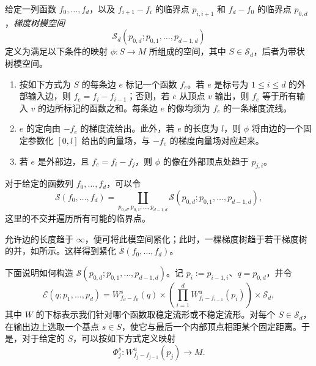 \begin{definition}\label{def:8.10}
给定一列函数 $f_0,\ldots,f_d$，以及 $f_{i+1}-f_i$ 的临界点 $p_{i,i+1}$ 和 $f_d-f_0$ 的临界点 $p_{0,d}$，\emph{梯度树模空间}
\[
\mathcal S_d(p_{0,d};p_{0,1},\ldots,p_{d-1,d})
\]
定义为满足以下条件的映射 $\phi\colon S\to M$ 所组成的空间，其中 $S\in\mathcal S_d$，后者为带状树模空间。
\begin{enumerate}
\item 按如下方式为 $S$ 的每条边 $e$ 标记一个函数 $f_e$。若 $e$ 是标号为 $1\leq i\leq d$ 的外部输入边，则 $f_e=f_i-f_{i-1}$；否则，若 $e$ 从顶点 $v$ 输出，则 $f_e$ 等于所有输入 $v$ 的边所标记的函数之和。每条边 $e$ 的像均须为 $f_e$ 的一条梯度流线。
\item $e$ 的定向由 $-f_e$ 的梯度流给出。此外，若 $e$ 的长度为 $l$，则 $\phi$ 将由边的一个固定参数化 $[0,l]$ 给出的向量场，与 $-f_e$ 的梯度向量场对应起来。
\item 若 $e$ 是外部边，且 $f_e=f_i-f_j$，则 $\phi$ 的像在外部顶点处趋于 $p_{j,i}$。
\end{enumerate}
\end{definition}

对于给定的函数列 $f_0,\ldots,f_d$，可以令
\[
\mathcal S(f_0,\ldots,f_d)=
\coprod_{p_{0,d},p_{0,1},\ldots,p_{d-1,d}}
\mathcal S(p_{0,d};p_{0,1},\ldots,p_{d-1,d}),
\]
这里的不交并遍历所有可能的临界点。

允许边的长度趋于 $\infty$，便可将此模空间紧化；此时，一棵梯度树趋于若干梯度树的并，如所示。这样得到紧化 $\overline{\mathcal S}(f_0,\ldots,f_d)$。

\setcounter{figure}{15}
\begin{figure}[H]
\centering
{}
\BookNumberOnlyCaption\label{fig:8.16}
\end{figure}

下面说明如何构造 $\mathcal S(p_{0,d};p_{0,1},\ldots,p_{d-1,d})$。记 $p_i:=p_{i-1,i}$、$q=p_{0,d}$，并令
\[
\mathcal E(q;p_1,\ldots,p_d)=W^s_{f_d-f_0}(q)
\times\left(\prod_{i=1}^dW^u_{f_i-f_{i-1}}(p_i)\right)\times\mathcal S_d,
\]
其中 $W$ 的下标表示我们针对哪个函数取稳定流形或不稳定流形。对每个 $S\in\mathcal S_d$，在输出边上选取一个基点 $s\in S$，使它与最后一个内部顶点相距某个固定距离。于是，对于给定的 $S$，可以按如下方式定义映射
\[
\Phi_j^s\colon W^u_{f_j-f_{j-1}}(p_j)\longrightarrow M.
\]

